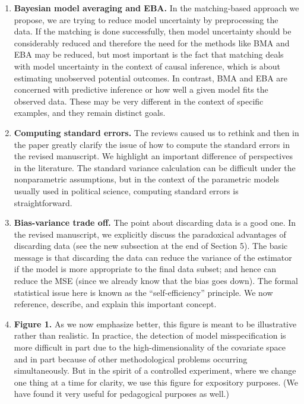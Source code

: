 \documentclass[11pt]{article}
\begin{document}
\begin{enumerate}
\item {\bf Bayesian model averaging and EBA.} In the matching-based
  approach we propose, we are trying to reduce model uncertainty by
  preprocessing the data.  If the matching is done successfully, then
  model uncertainty should be considerably reduced and therefore the
  need for the methods like BMA and EBA may be reduced, but most
  important is the fact that matching deals with model uncertainty in
  the context of causal inference, which is about estimating
  unobserved potential outcomes.  In contrast, BMA and EBA are
  concerned with predictive inference or how well a given model fits
  the observed data.  These may be very different in the context of
  specific examples, and they remain distinct goals.
  
\item {\bf Computing standard errors.}  The reviews caused us to
  rethink and then in the paper greatly clarify the issue of how to
  compute the standard errors in the revised manuscript.  We highlight
  an important difference of perspectives in the literature.  The
  standard variance calculation can be difficult under the
  nonparametric assumptions, but in the context of the parametric
  models usually used in political science, computing standard errors
  is straightforward.
  
\item {\bf Bias-variance trade off.} The point about discarding data
  is a good one.  In the revised manuscript, we explicitly discuss the
  paradoxical advantages of discarding data (see the new subsection at
  the end of Section 5). The basic message is that discarding the data
  can reduce the variance of the estimator if the model is more
  appropriate to the final data subset; and hence can reduce the MSE
  (since we already know that the bias goes down).  The formal
  statistical issue here is known as the ``self-efficiency''
  principle.  We now reference, describe, and explain this important
  concept.
  
\item {\bf Figure 1.} As we now emphasize better, this figure is meant
  to be illustrative rather than realistic. In practice, the detection
  of model misspecification is more difficult in part due to the
  high-dimensionality of the covariate space and in part because of
  other methodological problems occurring simultaneously.  But in the
  spirit of a controlled experiment, where we change one thing at a
  time for clarity, we use this figure for expository purposes.  (We
  have found it very useful for pedagogical purposes as well.)
  

\end{enumerate}
\end{document}
